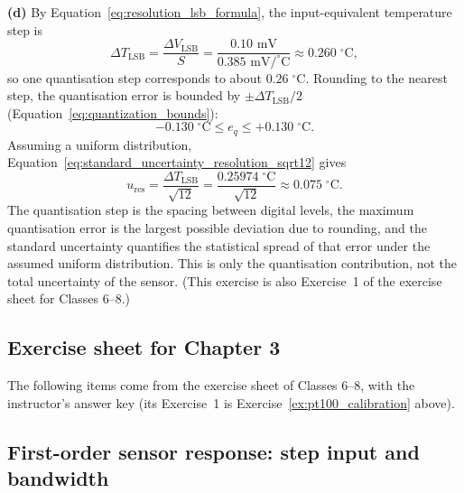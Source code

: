 \textbf{(d)} By Equation~\eqref{eq:resolution_lsb_formula}, the input-equivalent temperature step is
\begin{equation*}
\Delta T_{\text{LSB}} = \frac{\Delta V_{\text{LSB}}}{S} = \frac{0.10\text{ mV}}{0.385\text{ mV}/^\circ\text{C}} \approx 0.260\;^\circ\text{C},
\end{equation*}
so one quantisation step corresponds to about $0.26\;^\circ\text{C}$. Rounding to the nearest step, the quantisation error is bounded by $\pm\Delta T_{\text{LSB}}/2$ (Equation~\eqref{eq:quantization_bounds}):
\begin{equation*}
-0.130\;^\circ\text{C} \le e_q \le +0.130\;^\circ\text{C}.
\end{equation*}
Assuming a uniform distribution, Equation~\eqref{eq:standard_uncertainty_resolution_sqrt12} gives
\begin{equation*}
u_{\text{res}} = \frac{\Delta T_{\text{LSB}}}{\sqrt{12}} = \frac{0.25974\;^\circ\text{C}}{\sqrt{12}} \approx 0.075\;^\circ\text{C}.
\end{equation*}
The quantisation step is the spacing between digital levels, the maximum quantisation error is the largest possible deviation due to rounding, and the standard uncertainty quantifies the statistical spread of that error under the assumed uniform distribution. This is only the quantisation contribution, not the total uncertainty of the sensor. (This exercise is also Exercise~1 of the exercise sheet for Classes 6--8.)

\subsection*{Exercise sheet for Chapter 3}

The following items come from the exercise sheet of Classes 6--8, with the instructor's answer key (its Exercise~1 is Exercise~\ref{ex:pt100_calibration} above).

\subsection{First-order sensor response: step input and bandwidth}
\label{ex:first_order_bandwidth}

